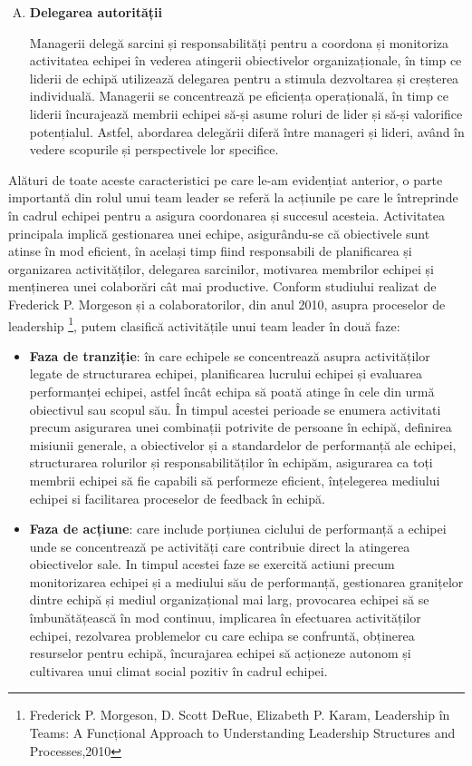 \documentclass[a4paper, 12pt]{article}
\begin{document}
\begin{enumerate}[A)]
		\item \textbf{Delegarea autorității}

		\quad\quad Managerii delegă sarcini și responsabilități pentru a coordona și monitoriza activitatea echipei în vederea atingerii obiectivelor organizaționale, în timp ce liderii de echipă utilizează delegarea pentru a stimula dezvoltarea și creșterea individuală. Managerii se concentrează pe eficiența operațională, în timp ce liderii încurajează membrii echipei să-și asume roluri de lider și să-și valorifice potențialul. Astfel, abordarea delegării diferă între manageri și lideri, având în vedere scopurile și perspectivele lor specifice.

	\end{enumerate}


	\quad\space Alături de toate aceste caracteristici pe care le-am evidențiat anterior, o parte importantă din rolul unui team leader se referă la acțiunile pe care le întreprinde în cadrul echipei pentru a asigura coordonarea și succesul acesteia. Activitatea principala implică gestionarea unei echipe, asigurându-se că obiectivele sunt atinse în mod eficient, în același timp fiind responsabili de planificarea și organizarea activităților, delegarea sarcinilor, motivarea membrilor echipei și menținerea unei colaborări cât mai productive. Conform studiului realizat de Frederick P. Morgeson și a colaboratorilor, din anul 2010, asupra proceselor de leadership \footnote{Frederick P. Morgeson, D. Scott DeRue, Elizabeth P. Karam, Leadership în Teams: A Funcțional Approach to Understanding Leadership Structures and Processes,2010}, putem clasifică activitățile unui team leader în două faze: 
	\begin{itemize}

	\item \textbf{Faza de tranziție}: în care echipele se concentrează asupra activităților legate de structurarea echipei, planificarea lucrului echipei și evaluarea performanței echipei, astfel încât echipa să poată atinge în cele din urmă obiectivul sau scopul său. În timpul acestei perioade  se enumera activitati precum asigurarea unei combinații potrivite de persoane în echipă, definirea misiunii generale, a obiectivelor și a standardelor de performanță ale echipei, structurarea rolurilor și responsabilităților în echipăm, asigurarea ca toți membrii echipei să fie capabili să performeze eficient, înțelegerea mediului echipei si facilitarea proceselor de feedback în echipă. 

	\item \textbf{Faza de acțiune}: care include porțiunea ciclului de performanță a echipei unde se concentrează pe activități care contribuie direct la atingerea obiectivelor sale. In timpul acestei faze se exercită actiuni precum monitorizarea echipei și a mediului său de performanță, gestionarea granițelor dintre echipă și mediul organizațional mai larg, provocarea echipei să se îmbunătățească în mod continuu, implicarea în efectuarea activităților echipei, rezolvarea problemelor cu care echipa se confruntă, obținerea resurselor pentru echipă, încurajarea echipei să acționeze autonom și cultivarea unui climat social pozitiv în cadrul echipei. 
	\end{itemize}
\end{document}
